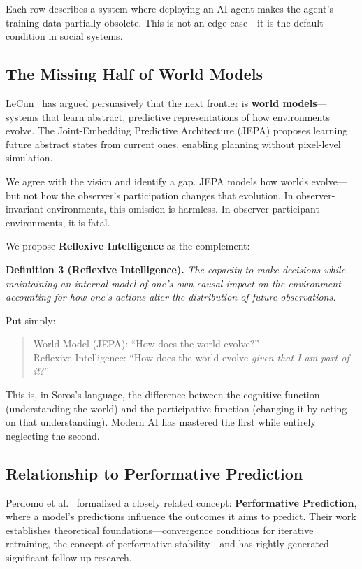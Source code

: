 \documentclass[11pt,a4paper]{article}
\begin{document}
Each row describes a system where deploying an AI agent makes the agent's training data partially obsolete. This is not an edge case---it is the default condition in social systems.

\subsection{The Missing Half of World Models}

LeCun~\citep{lecun2022} has argued persuasively that the next frontier is \textbf{world models}---systems that learn abstract, predictive representations of how environments evolve. The Joint-Embedding Predictive Architecture (JEPA) proposes learning future abstract states from current ones, enabling planning without pixel-level simulation.

We agree with the vision and identify a gap. JEPA models how worlds evolve---but not how the observer's participation changes that evolution. In observer-invariant environments, this omission is harmless. In observer-participant environments, it is fatal.

We propose \textbf{Reflexive Intelligence} as the complement:

\vspace{0.5em}
\noindent\textbf{Definition 3 (Reflexive Intelligence).} \textit{The capacity to make decisions while maintaining an internal model of one's own causal impact on the environment---accounting for how one's actions alter the distribution of future observations.}
\vspace{0.5em}

Put simply:
\begin{quote}
World Model (JEPA): ``How does the world evolve?''\\
Reflexive Intelligence: ``How does the world evolve \textit{given that I am part of it}?''
\end{quote}

This is, in Soros's language, the difference between the cognitive function (understanding the world) and the participative function (changing it by acting on that understanding). Modern AI has mastered the first while entirely neglecting the second.

\subsection{Relationship to Performative Prediction}

Perdomo et al.~\citep{perdomo2020} formalized a closely related concept: \textbf{Performative Prediction}, where a model's predictions influence the outcomes it aims to predict. Their work establishes theoretical foundations---convergence conditions for iterative retraining, the concept of performative stability---and has rightly generated significant follow-up research.
\end{document}

